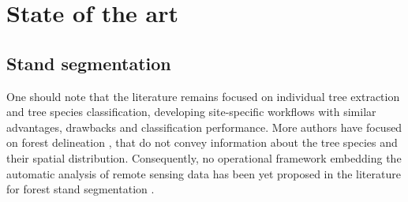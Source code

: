 \chapter{State of the art} %
\label{Chapter1} %

\startcontents[chapters]
\Mprintcontents





\section{Stand segmentation}
One should note that the literature remains focused on individual tree extraction and tree species classification, developing site-specific workflows with similar advantages, drawbacks and classification performance. More authors have focused on forest delineation \citep{eysn2012forest}, that do not convey information about the tree species and their spatial distribution. Consequently, no operational framework embedding the automatic analysis of remote sensing data has been yet proposed in the literature for forest stand segmentation \citep{clement_IJPRS}. \\

